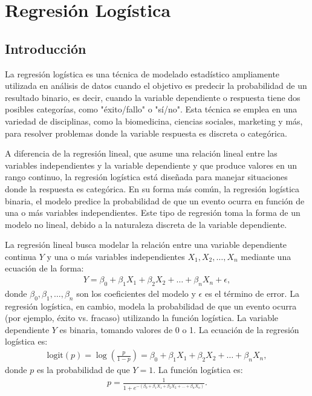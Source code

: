 \documentclass[a4paper]{report} %
\begin{document}
\chapter{Regresi\'on Log\'istica}


\section{Introducci\'on}


La regresión logística es una técnica de modelado estadístico ampliamente utilizada en análisis de datos cuando el objetivo es predecir la probabilidad de un resultado binario, es decir, cuando la variable dependiente o respuesta tiene dos posibles categorías, como "éxito/fallo" o "sí/no". Esta técnica se emplea en una variedad de disciplinas, como la biomedicina, ciencias sociales, marketing y más, para resolver problemas donde la variable respuesta es discreta o categórica.\medskip

A diferencia de la regresión lineal, que asume una relación lineal entre las variables independientes y la variable dependiente y que produce valores en un rango continuo, la regresión logística está diseñada para manejar situaciones donde la respuesta es categórica. En su forma más común, la regresión logística binaria, el modelo predice la probabilidad de que un evento ocurra en función de una o más variables independientes. Este tipo de regresión toma la forma de un modelo no lineal, debido a la naturaleza discreta de la variable dependiente.\medskip


La regresión lineal busca modelar la relación entre una variable dependiente continua $Y$ y una o más variables independientes $X_1, X_2, \ldots, X_n$ mediante una ecuación de la forma:
\begin{eqnarray}
Y = \beta_0 + \beta_1 X_1 + \beta_2 X_2 + \ldots + \beta_n X_n + \epsilon,
\end{eqnarray}
donde $\beta_0, \beta_1, \ldots, \beta_n$ son los coeficientes del modelo y $\epsilon$ es el término de error. La regresión logística, en cambio, modela la probabilidad de que un evento ocurra (por ejemplo, éxito vs. fracaso) utilizando la función logística. La variable dependiente $Y$ es binaria, tomando valores de 0 o 1. La ecuación de la regresión logística es:
\begin{eqnarray}
\text{logit}(p) = \log\left(\frac{p}{1-p}\right) = \beta_0 + \beta_1 X_1 + \beta_2 X_2 + \ldots + \beta_n X_n,
\end{eqnarray}
donde $p$ es la probabilidad de que $Y=1$. La función logística es:
\begin{eqnarray}
p = \frac{1}{1 + e^{-(\beta_0 + \beta_1 X_1 + \beta_2 X_2 + \ldots + \beta_n X_n)}}.
\end{eqnarray}
\end{document}
